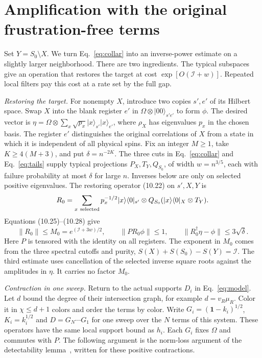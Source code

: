\documentclass[aps,prb,onecolumn,10pt,nofootinbib]{revtex4-2}
\newcommand{\id}{\mathbf{1}}
\providecommand{\ket}[1]{\lvert #1\rangle}
\providecommand{\bra}[1]{\langle #1\rvert}
\newcommand{\norm}[1]{\lVert #1\rVert}
\newcommand{\MI}{\mathcal I}
\begin{document}
\section{Amplification with the original frustration-free terms}

Set $Y=S_0\setminus X$. We turn Eq.~\eqref{eq:collar} into an inverse-power estimate on a slightly larger neighborhood. There are two ingredients. The typical subspaces give an operation that restores the target at cost $\exp[O(\MI+w)]$. Repeated local filters pay this cost at a rate set by the full gap.

\emph{Restoring the target.}
For nonempty $X$, introduce two copies $s',e'$ of its Hilbert space. Swap $X$ into the blank register $e'$ in $\Omega\otimes\ket{00}_{s'e'}$ to form $\phi$. The desired vector is $\eta=\Omega\otimes\sum_x\sqrt{p_x}\ket{x}_{s'}\ket{x}_{e'}$, where $\rho_X$ has eigenvalues $p_x$ in the chosen basis. The register $e'$ distinguishes the original correlations of $X$ from a state in which it is independent of all physical spins. Fix an integer $M\ge1$, take $K\ge4(M+3)$, and put $\delta=n^{-2K}$. The three cuts in Eq.~\eqref{eq:collar} and Eq.~\eqref{eq:tails} supply typical projections $P_X,T_Y,Q_{S_0}$, of width $w=n^{3/5}$, each with failure probability at most $\delta$ for large $n$. Inverses below are only on selected positive eigenvalues. The restoring operator (10.22) on $s',X,Y$ is
\[
 R_0=\sum_{x\ {\rm selected}} p_x^{-1/2}
  \ket{x}\bra{0}_{s'}\otimes Q_{S_0}(\ket{x}\bra{0}_X\otimes T_Y).
\]
Equations (10.25)--(10.28) give
\begin{equation}
 \norm{R_0}\le M_0=e^{(\MI+3w)/2},\qquad
 \norm{P R_0\phi}\le1,\qquad
 \norm{R_0^\dagger\eta-\phi}\le3\sqrt{\delta}.
 \label{eq:restore}
\end{equation}
Here $P$ is tensored with the identity on all registers. The exponent in $M_0$ comes from the three spectral cutoffs and purity, $S(X)+S(S_0)-S(Y)=\MI$. The third estimate uses cancellation of the selected inverse square roots against the amplitudes in $\eta$. It carries no factor $M_0$.

\emph{Contraction in one sweep.}
Return to the actual supports $D_i$ in Eq.~\eqref{eq:model}. Let $d$ bound the degree of their intersection graph, for example $d=v_R\mu_R$. Color it in $\chi\le d+1$ colors and order the terms by color. Write $G_i=(\id-k_i)^{1/2}$, $K_i=k_i^{1/2}$ and $D=G_N\cdots G_1$ for one sweep over the $N$ terms of this system. These operators have the same local support bound as $h_i$. Each $G_i$ fixes $\Omega$ and commutes with $P$. The following argument is the norm-loss argument of the detectability lemma~\cite{aav}, written for these positive contractions.
\end{document}
